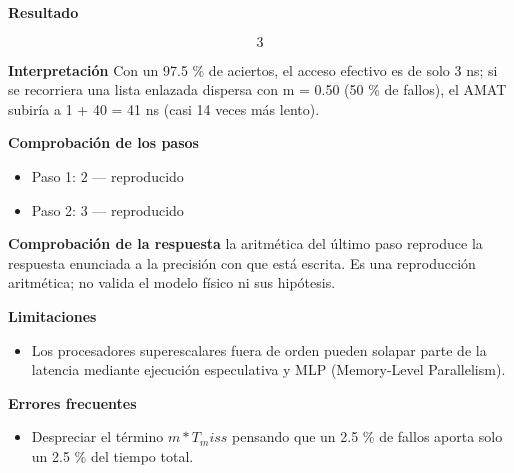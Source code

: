 \documentclass{book}
\begin{document}
\begin{tcolorbox}[title={Problema resuelto}, studiumworked, breakable]
\noindent\textbf{Resultado}

\[
3
\]

\noindent\textbf{Interpretación}
Con un 97.5 \% de aciertos, el acceso efectivo es de solo 3 ns; si se recorriera una lista enlazada dispersa con m = 0.50 (50 \% de fallos), el AMAT subiría a 1 + 40 = 41 ns (casi 14 veces más lento).

\noindent\textbf{Comprobación de los pasos}
\begin{itemize}
\item Paso 1: $2$ — reproducido
\item Paso 2: $3$ — reproducido
\end{itemize}

\noindent\textbf{Comprobación de la respuesta} la aritmética del último paso reproduce la respuesta enunciada a la precisión con que está escrita. Es una reproducción aritmética; no valida el modelo físico ni sus hipótesis.

\noindent\textbf{Limitaciones}
\begin{itemize}
\item Los procesadores superescalares fuera de orden pueden solapar parte de la latencia mediante ejecución especulativa y MLP (Memory-Level Parallelism).
\end{itemize}

\noindent\textbf{Errores frecuentes}
\begin{itemize}
\item Despreciar el término \(m * T_miss\) pensando que un 2.5 \% de fallos aporta solo un 2.5 \% del tiempo total.
\end{itemize}
\end{tcolorbox}
\end{document}
